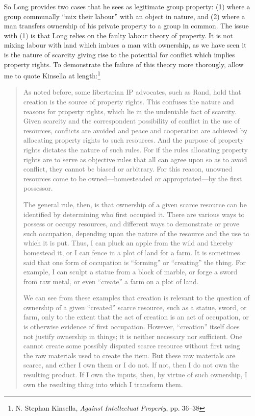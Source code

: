\documentclass[11pt]{article}
\begin{document}
So Long provides two cases that he sees as legitimate group property: (1) where a group communally “mix their labour” with an object in nature, and (2) where a man transfers ownership of his private property to a group in common. The issue with (1) is that Long relies on the faulty labour theory of property. It is not mixing labour with land which imbues a man with ownership, as we have seen it is the nature of scarcity giving rise to the potential for conflict which implies property rights. To demonstrate the failure of this theory more thorougly, allow me to quote Kinsella at length:\footnote{N. Stephan Kinsella, \emph{Against Intellectual Property}, pp. 36–38}
\begin{quote}
As noted before, some libertarian IP advocates, such as Rand, hold that creation is the source of property rights. This confuses the nature and reasons for property rights, which lie in the undeniable fact of scarcity. Given scarcity and the correspondent possibility of conflict in the use of resources, conflicts are avoided and peace and cooperation are achieved by allocating property rights to such resources. And the purpose of property rights dictates the nature of such rules. For if the rules allocating property rights are to serve as objective rules that all can agree upon so as to avoid conflict, they cannot be biased or arbitrary. For this reason, unowned resources come to be owned—homesteaded or appropriated—by the first possessor.

The general rule, then, is that ownership of a given scarce resource can be identified by determining who first occupied it. There are various ways to possess or occupy resources, and different ways to demonstrate or prove such occupation, depending upon the nature of the resource and the use to which it is put. Thus, I can pluck an apple from the wild and thereby homestead it, or I can fence in a plot of land for a farm. It is sometimes said that one form of occupation is “forming” or “creating” the thing. For example, I can sculpt a statue from a block of marble, or forge a sword from raw metal, or even “create” a farm on a plot of land.

We can see from these examples that creation is relevant to the question of ownership of a given “created” scarce resource, such as a statue, sword, or farm, only to the extent that the act of creation is an act of occupation, or is otherwise evidence of first occupation. However, “creation” itself does not justify ownership in things; it is neither necessary nor sufficient. One cannot create some possibly disputed scarce resource without first using the raw materials used to create the item. But these raw materials are scarce, and either I own them or I do not. If not, then I do not own the resulting product. If I own the inputs, then, by virtue of such ownership, I own the resulting thing into which I transform them.


\end{quote}
\end{document}
